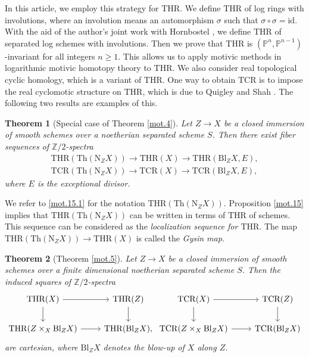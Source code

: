 \documentclass[10pt]{amsart}
\newtheorem{thm}{Theorem}[section]
\theoremstyle{definition}
\theoremstyle{remark}
\numberwithin{equation}{section}
\renewcommand{\P}{\mathbb{P}}
\newcommand{\id}{\mathrm{id}}
\newcommand{\Normal}{\mathrm{N}}
\newcommand{\Blow}{\mathrm{Bl}}
\newcommand{\Th}{\mathrm{Th}}
\newcommand{\THR}{\mathrm{THR}}
\newcommand{\TCR}{\mathrm{TCR}}
\newcommand{\Ztwo}{{\mathbb{Z}/2}}
\begin{document}
\medskip




In this article,
we employ this strategy for $\THR$.
We define $\THR$ of log rings with involutions,
where an involution means an automorphism $\sigma$ such that $\sigma\circ \sigma=\id$.
With the aid of the author's joint work with Hornbostel \cite{THR},
we define $\THR$ of separated log schemes with involutions.
Then we prove that $\THR$ is $(\P^n,\P^{n-1})$-invariant for all integers $n\geq 1$.
This allows us to apply motivic methods in logarithmic motivic homotopy theory to $\THR$.
We also consider real topological cyclic homology,
which is a variant of $\THR$.
One way to obtain $\TCR$ is to impose the real cyclomotic structure on $\THR$, which is due to Quigley and Shah \cite{QS2}.
The following two results are examples of this.


\medskip


\begin{thm}
[Special case of Theorem \ref{mot.4}]
\label{intro.1}
Let $Z\to X$ be a closed immersion of smooth schemes over a noetherian separated scheme $S$.
Then there exist fiber sequences of $\Ztwo$-spectra
\begin{gather*}
\THR(\Th(\Normal_Z X))
\to
\THR(X)
\to
\THR(\Blow_Z X,E),
\\
\TCR(\Th(\Normal_Z X))
\to
\TCR(X)
\to
\TCR(\Blow_Z X,E),
\end{gather*}
where $E$ is the exceptional divisor.
\end{thm}

We refer to \eqref{mot.15.1} for the notation $\THR(\Th(\Normal_Z X))$.
Proposition \ref{mot.15} implies that
$\THR(\Th(\Normal_Z X))$ can be written in terms of $\THR$ of schemes.
This sequence can be considered as the \emph{localization sequence for $\THR$}.
The map $\THR(\Th(\Normal_Z X)) \to \THR(X)$ is called the \emph{Gysin map}.


\begin{thm}
[Theorem \ref{mot.5}]
\label{intro.2}
Let $Z\to X$ be a closed immersion of smooth schemes over a finite dimensional noetherian separated scheme $S$.
Then the induced squares of $\Ztwo$-spectra
\[
\begin{tikzcd}
\THR(X)\ar[d]\ar[r]&
\THR(Z)\ar[d]
\\
\THR(Z\times_X \Blow_Z X)\ar[r]&
\THR(\Blow_Z X),
\end{tikzcd}
\begin{tikzcd}
\TCR(X)\ar[d]\ar[r]&
\TCR(Z)\ar[d]
\\
\TCR(Z\times_X \Blow_Z X)\ar[r]&
\TCR(\Blow_Z X)
\end{tikzcd}
\]
are cartesian,
where $\Blow_Z X$ denotes the blow-up of $X$ along $Z$.
\end{thm}
\end{document}
